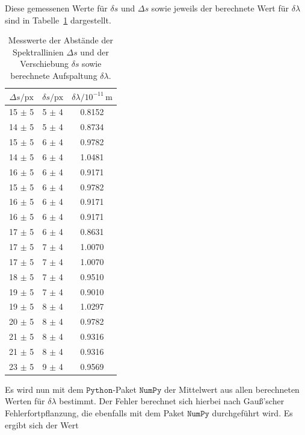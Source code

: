 Diese gemessenen Werte für $\delta s$ und $\Delta s$ sowie jeweils der berechnete Wert für $\delta \lambda$ sind in Tabelle \ref{tab:atab2} dargestellt.
\FloatBarrier
\begin{table}[h]
    \centering
    \caption{Messwerte der Abstände der Spektrallinien $\Delta s$ und der Verschiebung $\delta s$ sowie berechnete Aufspaltung $\delta \lambda$.}
    \label{tab:atab2}
    \begin{tabular}{c c c}
        \toprule
        {$\Delta s / \text{px}$} & {$\delta s / \text{px}$} & {$\delta \lambda / 10^{-11}\, \si{\meter}$}\\
        \midrule
        15 $\pm$ 5 & 5 $\pm$ 4 & 0.8152 \\ 
        14 $\pm$ 5 & 5 $\pm$ 4 & 0.8734 \\
        15 $\pm$ 5 & 6 $\pm$ 4 & 0.9782 \\
        14 $\pm$ 5 & 6 $\pm$ 4 & 1.0481 \\
        16 $\pm$ 5 & 6 $\pm$ 4 & 0.9171 \\
        15 $\pm$ 5 & 6 $\pm$ 4 & 0.9782 \\
        16 $\pm$ 5 & 6 $\pm$ 4 & 0.9171 \\ 
        16 $\pm$ 5 & 6 $\pm$ 4 & 0.9171 \\
        17 $\pm$ 5 & 6 $\pm$ 4 & 0.8631 \\ 
        17 $\pm$ 5 & 7 $\pm$ 4 & 1.0070 \\ 
        17 $\pm$ 5 & 7 $\pm$ 4 & 1.0070 \\
        18 $\pm$ 5 & 7 $\pm$ 4 & 0.9510 \\
        19 $\pm$ 5 & 7 $\pm$ 4 & 0.9010 \\
        19 $\pm$ 5 & 8 $\pm$ 4 & 1.0297 \\
        20 $\pm$ 5 & 8 $\pm$ 4 & 0.9782 \\
        21 $\pm$ 5 & 8 $\pm$ 4 & 0.9316 \\
        21 $\pm$ 5 & 8 $\pm$ 4 & 0.9316 \\
        23 $\pm$ 5 & 9 $\pm$ 4 & 0.9569 \\
        \bottomrule
    \end{tabular}
\end{table}
\FloatBarrier
\noindent
Es wird nun mit dem $\texttt{Python}$-Paket $\texttt{NumPy}$ der Mittelwert aus allen
berechneten Werten für $\delta \lambda$ bestimmt. Der Fehler berechnet sich hierbei nach Gauß'scher Fehlerfortpflanzung,
die ebenfalls mit dem Paket $\texttt{NumPy}$ durchgeführt wird. Es ergibt sich der Wert
